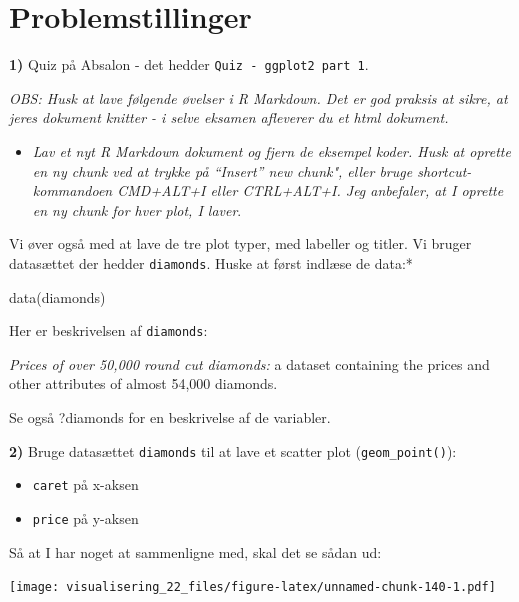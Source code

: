 \documentclass[
]{book}
\newenvironment{Shaded}{\begin{snugshade}}{\end{snugshade}}
\newcommand{\FunctionTok}[1]{\textcolor[rgb]{0.00,0.00,0.00}{#1}}
\newcommand{\NormalTok}[1]{#1}
\providecommand{\tightlist}{%
  \setlength{\itemsep}{0pt}\setlength{\parskip}{0pt}}
\begin{document}
\hypertarget{problemstillinger-2}{%
\section{Problemstillinger}\label{problemstillinger-2}}

\textbf{1)} Quiz på Absalon - det hedder \texttt{Quiz\ -\ ggplot2\ part\ 1}.

\emph{OBS: Husk at lave følgende øvelser i R Markdown. Det er god praksis at sikre, at jeres dokument knitter - i selve eksamen afleverer du et html dokument.}

\begin{itemize}
\tightlist
\item
  \emph{Lav et nyt R Markdown dokument og fjern de eksempel koder. Husk at oprette en ny chunk ved at trykke på ``Insert'' new chunk", eller bruge shortcut-kommandoen CMD+ALT+I eller CTRL+ALT+I. Jeg anbefaler, at I oprette en ny chunk for hver plot, I laver}.
\end{itemize}

Vi øver også med at lave de tre plot typer, med labeller og titler. Vi bruger datasættet der hedder \texttt{diamonds}. Huske at først indlæse de data:*

\begin{Shaded}
\begin{Highlighting}[]
\FunctionTok{data}\NormalTok{(diamonds)}
\end{Highlighting}
\end{Shaded}

Her er beskrivelsen af \texttt{diamonds}:

\emph{Prices of over 50,000 round cut diamonds:} a dataset containing the prices and other attributes of almost 54,000 diamonds.

Se også ?diamonds for en beskrivelse af de variabler.

\textbf{2)} Bruge datasættet \texttt{diamonds} til at lave et scatter plot (\texttt{geom\_point()}):

\begin{itemize}
\tightlist
\item
  \texttt{caret} på x-aksen
\item
  \texttt{price} på y-aksen
\end{itemize}

Så at I har noget at sammenligne med, skal det se sådan ud:

\texttt{[image: visualisering\_22\_files/figure-latex/unnamed-chunk-140-1.pdf]}
\end{document}
